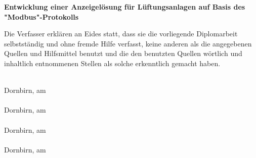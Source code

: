 
\vspace{30pt}

\begin{center}
    \textbf{\LARGE Entwicklung einer Anzeigelösung für Lüftungsanlagen auf Basis des "Modbus"-Protokolls}
\end{center}

\vspace{30pt}

\noindent Die Verfasser erklären an Eides statt, dass sie die vorliegende Diplomarbeit selbstständig und ohne fremde Hilfe verfasst, keine anderen als die angegebenen Quellen und Hilfsmittel benutzt und die den benutzten Quellen wörtlich und inhaltlich entnommenen Stellen als solche erkenntlich gemacht haben.

\vfill

\noindent
\begin{minipage}[t]{0.35\textwidth}
\centering
\underline{\hspace{5cm}} \\
\vspace{-0.4\baselineskip}
Dornbirn, am \\
\underline{\hspace{5cm}} \\
\vspace{-0.4\baselineskip}
Dornbirn, am \\
\underline{\hspace{5cm}} \\
\vspace{-0.4\baselineskip}
Dornbirn, am \\
\underline{\hspace{5cm}} \\
\vspace{-0.4\baselineskip}
Dornbirn, am \\
\end{minipage}

\hfill

\begin{minipage}[t]{0.55\textwidth}
\centering
\underline{\hspace{7cm}} \\
\vspace{-0.4\baselineskip}
\fenkart \\
\underline{\hspace{7cm}} \\
\vspace{-0.4\baselineskip}
\mangeng \\
\underline{\hspace{7cm}} \\
\vspace{-0.4\baselineskip}
\pezze \\
\underline{\hspace{7cm}} \\
\vspace{-0.4\baselineskip}
\schneider \\
\end{minipage}


